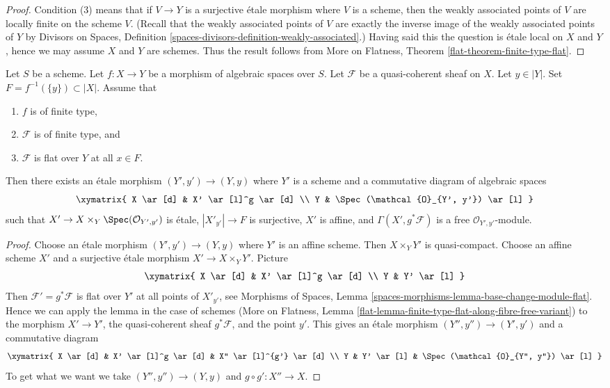 \begin{proof}
Condition (3) means that if $V \to Y$ is a surjective \'etale morphism
where $V$ is a scheme, then the weakly associated points of $V$
are locally finite on the scheme $V$. (Recall that the weakly associated
points of $V$ are exactly the inverse image of the weakly associated
points of $Y$ by Divisors on Spaces, Definition
\ref{spaces-divisors-definition-weakly-associated}.)
Having said this the question
is \'etale local on $X$ and $Y$, hence we may assume $X$ and $Y$
are schemes. Thus the result follows from
More on Flatness, Theorem \ref{flat-theorem-finite-type-flat}.
\end{proof}

\begin{lemma}
\label{lemma-finite-type-flat-along-fibre-free-variant}
Let $S$ be a scheme. Let $f : X \to Y$ be a morphism of algebraic spaces
over $S$. Let $\mathcal{F}$ be a quasi-coherent sheaf on $X$.
Let $y \in |Y|$. Set $F = f^{-1}(\{y\}) \subset |X|$. Assume that
\begin{enumerate}
\item $f$ is of finite type,
\item $\mathcal{F}$ is of finite type, and
\item $\mathcal{F}$ is flat over $Y$ at all $x \in F$.
\end{enumerate}
Then there exists an \'etale morphism $(Y', y') \to (Y, y)$
where $Y'$ is a scheme and a commutative diagram of algebraic spaces
$$
\xymatrix{
X \ar[d] & X' \ar[l]^g \ar[d] \\
Y & \Spec(\mathcal{O}_{Y', y'}) \ar[l]
}
$$
such that $X' \to X \times_Y \Spec(\mathcal{O}_{Y', y'})$
is \'etale, $|X'_{y'}| \to F$ is surjective, $X'$ is affine,
and $\Gamma(X', g^*\mathcal{F})$ is a free $\mathcal{O}_{Y', y'}$-module.
\end{lemma}

\begin{proof}
Choose an \'etale morphism $(Y', y') \to (Y, y)$ where $Y'$ is an
affine scheme. Then $X \times_Y Y'$ is quasi-compact.
Choose an affine scheme $X'$ and a surjective \'etale morphism
$X' \to X \times_Y Y'$. Picture
$$
\xymatrix{
X \ar[d] & X' \ar[l]^g \ar[d] \\
Y & Y' \ar[l]
}
$$
Then $\mathcal{F}' = g^*\mathcal{F}$ is flat over $Y'$ at all
points of $X'_{y'}$, see Morphisms of Spaces, Lemma
\ref{spaces-morphisms-lemma-base-change-module-flat}.
Hence we can apply the lemma in the case of schemes
(More on Flatness, Lemma
\ref{flat-lemma-finite-type-flat-along-fibre-free-variant})
to the morphism
$X' \to Y'$, the quasi-coherent sheaf $g^*\mathcal{F}$, and the point $y'$.
This gives an \'etale morphism $(Y'', y'') \to (Y', y')$ and a commutative
diagram
$$
\xymatrix{
X \ar[d] & X' \ar[l]^g \ar[d] & X'' \ar[l]^{g'} \ar[d] \\
Y & Y' \ar[l] & \Spec(\mathcal{O}_{Y'', y''}) \ar[l]
}
$$
To get what we want we take $(Y'', y'') \to (Y, y)$
and $g \circ g' : X'' \to X$.
\end{proof}

